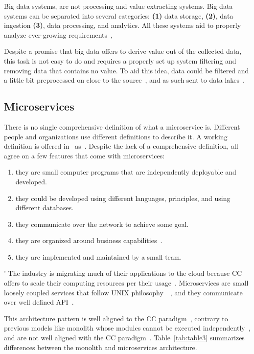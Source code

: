 \noindent
Big data systems, are not processing and value extracting systems. Big data systems can be separated into several categories: \textbf{(1)} data storage, \textbf{(2)}, data ingestion \textbf{(3)}, data processing, and analytics. All these systems aid to properly analyze ever-growing requirements~\cite{RaoMBG19},

Despite a promise that big data offers to derive value out of the collected data, this task is not easy to do and requires a properly set up system filtering and removing data that contains no value. To aid this idea, data could be filtered and a little bit preprocessed on close to the source~\cite{inproceedingsSimic1}, and as such sent to data lakes~\cite{MarynowskiSP15}.
%
%
\subsection{Microservices}\label{sec:microservices}
%
There is no single comprehensive definition of what a microservice is. Different people and organizations use different definitions to describe it. A working definition is offered in~\cite{DragoniGLMMMS16} as~. Despite the lack of a comprehensive definition, all agree on a few features that come with microservices:

\begin{enumerate}[start=1,label={(\bfseries \arabic*)}]
	\item they are small computer programs that are independently deployable and developed.
	\item they could be developed using different languages, principles, and using different databases.
	\item they communicate over the network to achieve some goal.
	\item they are organized around business capabilities~\cite{PautassoZALJ17}.
	\item they are implemented and maintained by a small team.
\end{enumerate}

'\noindent
The industry is migrating much of their applications to the cloud because CC offers to scale their computing resources per their usage~\cite{LiZJLZLGGS19}. Microservices are small loosely coupled services that follow UNIX philosophy~~\cite{krause2015microservices}, and they communicate over well defined API~\cite{DragoniGLMMMS16}.

This architecture pattern is well aligned to the CC paradigm~\cite{LiZJLZLGGS19}, contrary to previous models like monolith whose modules cannot be executed independently~\cite{DragoniGLMMMS16, abs-1905-07997}, and are not well aligned with the CC paradigm~\cite{abs-1905-07997}. Table~\ref{tab:table3} summarizes differences between the monolith and microservices architecture.


